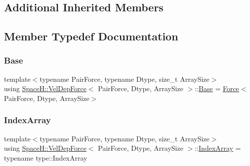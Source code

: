 \subsection*{Additional Inherited Members}


\subsection{Member Typedef Documentation}
\mbox{\label{struct_space_h_1_1_vel_dep_force_a47a0c85f93ae37d3cce8f708df096c65}} 
\subsubsection{\texorpdfstring{Base}{Base}}
{\footnotesize\ttfamily template$<$typename Pair\+Force, typename Dtype, size\+\_\+t Array\+Size$>$ \\
using \mbox{\hyperlink{struct_space_h_1_1_vel_dep_force}{Space\+H\+::\+Vel\+Dep\+Force}}$<$ Pair\+Force, Dtype, Array\+Size $>$\+::\mbox{\hyperlink{struct_space_h_1_1_vel_dep_force_a47a0c85f93ae37d3cce8f708df096c65}{Base}} =  \mbox{\hyperlink{struct_space_h_1_1_force}{Force}}$<$Pair\+Force, Dtype, Array\+Size$>$}

\mbox{\label{struct_space_h_1_1_vel_dep_force_a81473a733ed71f51b81323c705283195}} 
\subsubsection{\texorpdfstring{Index\+Array}{IndexArray}}
{\footnotesize\ttfamily template$<$typename Pair\+Force, typename Dtype, size\+\_\+t Array\+Size$>$ \\
using \mbox{\hyperlink{struct_space_h_1_1_vel_dep_force}{Space\+H\+::\+Vel\+Dep\+Force}}$<$ Pair\+Force, Dtype, Array\+Size $>$\+::\mbox{\hyperlink{struct_space_h_1_1_vel_dep_force_a81473a733ed71f51b81323c705283195}{Index\+Array}} =  typename type\+::\+Index\+Array}

\mbox{\label{struct_space_h_1_1_vel_dep_force_abbc363fffee12f9e015fd4978c132aad}} 
